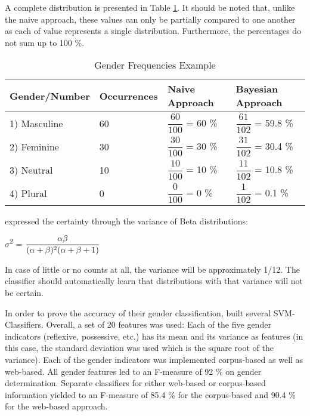 A complete distribution is presented in Table \ref{table:bergsma2004GenderFreqTable}. It should be noted that, unlike the naive approach, these values can only be partially compared to one another as each of value represents a single distribution. Furthermore, the percentages do not sum up to 100 \%.

\begin{table}[h]
      \caption{Gender Frequencies Example}
	\centering
    \renewcommand{\arraystretch}{2.0}
    \begin{tabular}{| l | l | l | l |}
    \hline
    Gender/Number & Occurrences & Naive Approach & Bayesian Approach \\ \hline
\hline
    1) Masculine & 60 & $\dfrac{60}{100}$ = 60 \% &  $\dfrac{61}{102}$ = 59.8 \% \\ \hline
    2) Feminine & 30 &  $\dfrac{30}{100}$ = 30 \% &  $\dfrac{31}{102}$ = 30.4 \% \\ \hline
    3) Neutral & 10 & $\dfrac{10}{100}$ = 10 \% & $\dfrac{11}{102}$ = 10.8 \%  \\ \hline
    4) Plural & 0 &    $\dfrac{0}{100}$ =  0 \% &  $\dfrac{1}{102}$ = 0.1 \% \\ \hline
    \end{tabular}

     \label{table:bergsma2004GenderFreqTable}
\end{table}

 \cite{bergsma2005automatic} expressed the certainty through the variance of Beta distributions:

\begin{center}
	$\sigma$\textsuperscript{2} =  $\dfrac{\alpha \beta }{(\alpha + \beta)\textsuperscript{2}(\alpha + \beta + 1)}$
\end{center}

In case of little or no counts at all, the variance will be approximately 1/12. The classifier should automatically learn that distributions with that variance will not be certain.

In order to prove the accuracy of their gender classification, \cite{bergsma2005automatic} built several SVM-Classifiers. Overall, a set of 20 features was used: Each of the five gender indicators (reflexive, possessive, etc.) has its mean and its variance as features (in this case, the standard deviation was used which is the square root of the variance). Each of the gender indicators was implemented corpus-based as well as web-based. All gender features led to an F-measure of 92 \% on gender determination. Separate classifiers for either web-based or corpus-based information yielded to an F-measure of 85.4 \% for the corpus-based and 90.4 \% for the web-based approach.

